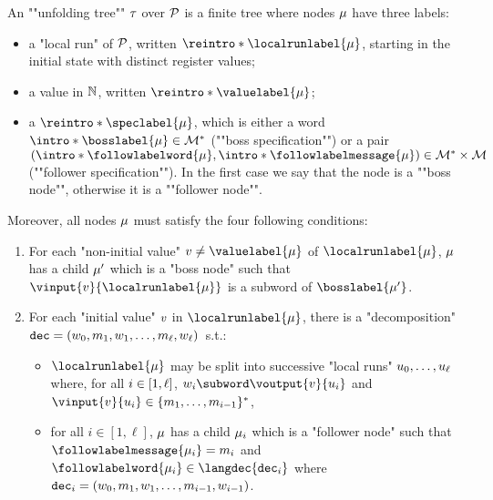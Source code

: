 \begin{definition}
	\label{def:unfolding_tree}
	\AP An ""unfolding tree"" $\tau$ over $\mathcal{P}$ is
	a finite tree where nodes $\mu$ have three labels:
	\begin{itemize}
		\item a "local run" of $\mathcal{P}$, written $\reintro*\localrunlabel{\node}$, starting in the initial state with distinct register values;
		
		\item a value in $\mathbb{N}$, written $\reintro*\valuelabel{\node}$;
		
		\item a  $\reintro*\speclabel{\node}$, which is either a word $\intro*\bosslabel{\node} \in \messages^*$ (""boss specification"") or a pair $(\intro*\followlabelword{\node}, \intro*\followlabelmessage{\node}) \in \messages^* \times \messages$ (""follower specification""). In the first case we say that the node is a ""boss node"", otherwise it is a ""follower node"".
	\end{itemize} 
	Moreover, all nodes $\mu$ must satisfy the four following conditions:
	\begin{enumerate}[label= (\roman*), ref=(\roman*)]
		\item \label{item:condition1_non_initial_value} For each "non-initial value" $\aval \ne \valuelabel{\node}$ of $\localrunlabel{\node}$, $\mu$ has a child $\mu'$ which is a "boss node" such that $\vinput{\aval}{\localrunlabel{\node}}$ is a subword of $\bosslabel{\node'}$.
		
		\item \label{item:condition2_initial_value} For each "initial value" $v$ in $\localrunlabel{\node}$, there is a "decomposition" \\ $\mathtt{dec} = (w_0, m_1, w_1, \ldots, m_{\ell}, w_{\ell})$~s.t.:
		\begin{itemize}
			\item $\localrunlabel{\node}$ may be split into successive "local runs" $u_0, \dots, u_{\ell}$ where, for all $i \in [1,\ell]$, $w_i \subword \voutput{\aval}{\localrun_i}$ and $\vinput{\aval}{\localrun_i} \in \set{m_1, \dots, m_{i-1}}^*$,
			\item for all $i \in [1,\ell]$, $\mu$ has a child $\mu_i$ which is a "follower node" such that $\followlabelmessage{\node_i} = m_i$ and $\followlabelword{\node_i} \in\langdec{\decsymb_i}$ where $\mathtt{dec}_i = (w_0, m_1, w_1, \ldots, m_{i-1}, w_{i-1})$.	\end{itemize}
		

\end{enumerate}
\end{definition}
